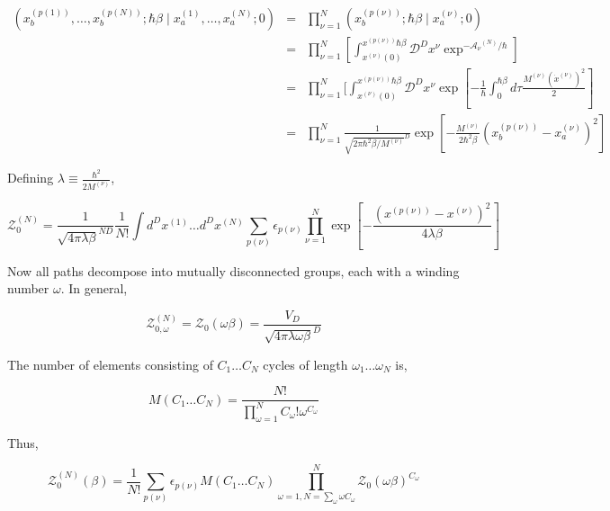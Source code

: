 \documentclass[aps,preprint,showpacs,superscriptaddress,groupedaddress]{revtex4}  %
\begin{document}
\begin{eqnarray}
  (x_{b}^{(p(1))},\dots,x_{b}^{(p(N))};\hbar \beta \mid x_{a}^{(1)},\dots,x_{a}^{(N)};0) &=& \prod_{\nu=1}^{N} (x_{b}^{(p(\nu))};\hbar \beta \mid x_{a}^{(\nu)};0) \\
                                                                                         &=& \prod_{\nu=1}^{N} [\int_{x^{(\nu)}(0)}^{x^{(p(\nu))}\hbar\beta} \mathcal{D}^{D}x^{\nu}\exp^{-\mathcal{A_{\nu}}^{(N)}/\hbar}] \\
                                                                                         &=& \prod_{\nu=1}^{N} [\int_{x^{(\nu)}(0)}^{x^{(p(\nu))}\hbar\beta} \mathcal{D}^{D}x^{\nu}\exp{[-\frac{1}{\hbar} \int_{0}^{\hbar\beta}d\tau \frac{M^{(\nu)} (\dot{x}^{(\nu)})^{2}}{2}]} \\
                                                                                         &=& \prod_{\nu=1}^{N} \frac{1}{\sqrt{2\pi\hbar^{2}\beta/M^{(\nu)}}^{D}} \exp{[-\frac{M^{(\nu)}}{2\hbar^{2}\beta} (x_{b}^{(p(\nu))} - x_{a}^{(\nu)})^{2}]}
\end{eqnarray}

Defining $\lambda \equiv \frac{\hbar^{2}}{2M^{(\nu)}}$,

\begin{equation}
  \mathcal{Z}^{(N)}_{0} = \frac{1}{\sqrt{4\pi\lambda\beta}^{ND}} \frac{1}{N!} \int d^{D}x^{(1)} \dots d^{D}x^{(N)} \sum_{p(\nu)} \epsilon_{p(\nu)} \prod_{\nu=1}^{N} \exp{[-\frac{(x^{(p(\nu))}-x^{(\nu)})^{2}}{4\lambda\beta}]}
\end{equation}

Now all paths decompose into mutually disconnected groups, each with a winding number $\omega$. In general,

\begin{equation}
  \mathcal{Z}^{(N)}_{0,\omega} = \mathcal{Z}_{0}(\omega\beta) = \frac{V_{D}}{\sqrt{4\pi\lambda\omega\beta}^{D}}
\end{equation}

The number of elements consisting of $C_{1} \dots C_{N}$ cycles of length $\omega_{1} \dots \omega_{N}$ is,

\begin{equation}
  M(C_{1} \dots C_{N}) = \frac{N!}{\prod_{\omega=1}^{N} C_{\omega}! \omega^{C_{\omega}}}
\end{equation}

Thus,

\begin{equation}
  \mathcal{Z}_{0}^{(N)}(\beta) = \frac{1}{N!} \sum_{p(\nu)} \epsilon_{p(\nu)} M(C_{1} \dots C_{N}) \prod_{\omega=1, N=\sum_{\omega}\omega C_{\omega}}^{N} \mathcal{Z}_{0}(\omega\beta)^{C_{\omega}}
\end{equation}
\end{document}
